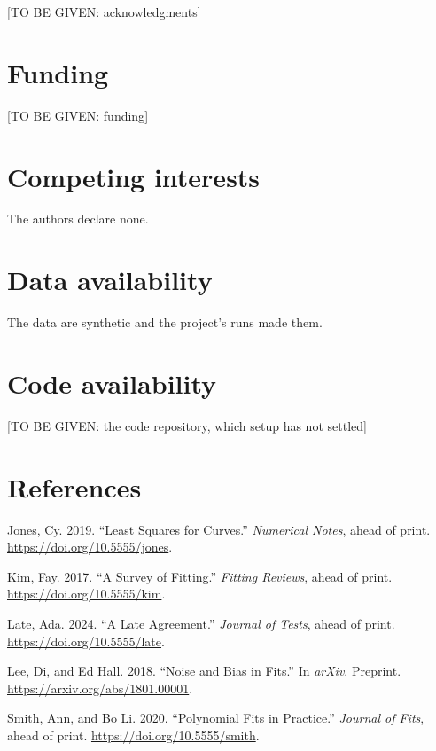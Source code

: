 \documentclass[
]{article}
\newcounter{none} %
\newlength{\cslhangindent}
\newenvironment{CSLReferences}[2] %
 {\begin{list}{}{%
  \setlength{\itemindent}{0pt}
  \setlength{\leftmargin}{0pt}
  \setlength{\parsep}{0pt}
  \ifodd #1
   \setlength{\leftmargin}{\cslhangindent}
   \setlength{\itemindent}{-1\cslhangindent}
  \fi
  \setlength{\itemsep}{#2\baselineskip}}}
 {\end{list}}
\begin{document}
{[}TO BE GIVEN: acknowledgments{]}

\section{Funding}\label{funding}

{[}TO BE GIVEN: funding{]}

\section{Competing interests}\label{competing-interests}

The authors declare none.

\section{Data availability}\label{data-availability}

The data are synthetic and the project's runs made them.

\section{Code availability}\label{code-availability}

{[}TO BE GIVEN: the code repository, which setup has not settled{]}

\section{References}\label{references}

\protect{}\label{refs}
\begin{CSLReferences}{1}{1}
Jones, Cy. 2019. {``Least Squares for Curves.''} \emph{Numerical Notes},
ahead of print. \url{https://doi.org/10.5555/jones}.

Kim, Fay. 2017. {``A Survey of Fitting.''} \emph{Fitting Reviews}, ahead
of print. \url{https://doi.org/10.5555/kim}.

Late, Ada. 2024. {``A Late Agreement.''} \emph{Journal of Tests}, ahead
of print. \url{https://doi.org/10.5555/late}.

Lee, Di, and Ed Hall. 2018. {``Noise and Bias in Fits.''} In
\emph{arXiv}. Preprint. \url{https://arxiv.org/abs/1801.00001}.

Smith, Ann, and Bo Li. 2020. {``Polynomial Fits in Practice.''}
\emph{Journal of Fits}, ahead of print.
\url{https://doi.org/10.5555/smith}.

\end{CSLReferences}
\end{document}
